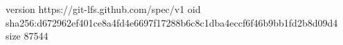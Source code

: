 version https://git-lfs.github.com/spec/v1
oid sha256:d672962ef401ce8a4fd4e6697f17288b6c8c1dba4eccf6f46b9bb1fd2b8d09d4
size 87544
